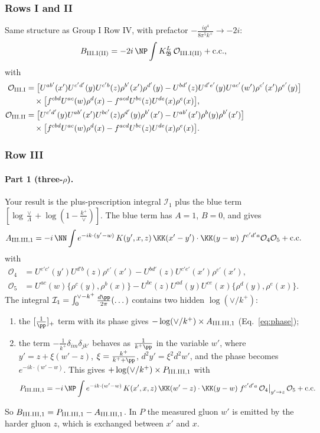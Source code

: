 \subsubsection{Rows I and II}
Same structure as Group I Row IV, with prefactor $-\frac{ig^4}{8\pi^5k^+}\to-2i$:
\begin{equation}
B_{\rm III.I(II)}=-2i\,\NP\int K^L_{\mathfrak B}\,\mathcal O_{\rm III.I(II)}+{\rm c.c.},
\end{equation}
with
\begin{align*}
\mathcal O_{\rm III.I}&=\big[U^{ab'}(x')U^{c'd'}(y)U^{c'b}(z)\rho^{b'}(x')\rho^{d'}(y)-U^{bd'}(z)U^{d'e'}(y)U^{ac'}(w')\rho^{c'}(x')\rho^{e'}(y)\big]\\
&\quad\times\big[f^{cbd}U^{ac}(w)\rho^d(x)-f^{acd}U^{bc}(z)U^{de}(x)\rho^e(x)\big],\\
\mathcal O_{\rm III.II}&=\big[U^{c'd'}(y)U^{ab'}(x')U^{bc'}(z)\rho^{d'}(y)\rho^{b'}(x')-U^{ab'}(x')\rho^b(y)\rho^{b'}(x')\big]\\
&\quad\times\big[f^{cbd}U^{ac}(w)\rho^d(x)-f^{acd}U^{bc}(z)U^{de}(x)\rho^e(x)\big].
\end{align*}

\subsubsection{Row III}\label{sec:G3III}
\paragraph{Part 1 (three-$\rho$).} Your result is the plus-prescription integral $\mathcal I_1$ plus the blue term $[\log\frac{\vee}{\Lambda}+\log(1-\frac{k^+}{\vee})]$. The blue term has $A=1$, $B=0$, and gives
\[
A_{\rm III.III,1}=-i\,\NN\int e^{-ik\cdot(y'-w)}\,K(y',x,z)\,\KK(x'-y')\cdot\KK(y-w)\;f^{c'd'a}\mathcal O_4\mathcal O_5+{\rm c.c.}
\]
with
\begin{align*}
\mathcal O_4&=U^{e'c'}(y')U^{d'b}(z)\rho^{e'}(x')-U^{bd'}(z)U^{c'e'}(x')\rho^{e'}(x'),\\
\mathcal O_5&=U^{ac}(w)\{\rho^c(y),\rho^b(x)\}-U^{bc}(z)U^{ad}(y)U^{ce}(x)\{\rho^d(y),\rho^e(x)\}.
\end{align*} The integral $\mathcal I_1=\int_0^{\vee-k^+}\frac{d\pp}{2\pi}(\dots)$ contains two hidden $\log(\vee/k^+)$:
\begin{enumerate}
\item the $[\frac1\pp]_+$ term with its phase gives $-\log(\vee/k^+)\times A_{\rm III.III,1}$ (Eq.~\eqref{eq:phase});
\item the term $-\frac1{k^+}\delta_{im}\delta_{jk'}$ behaves as $\frac{1}{k^+\pp}$ in the variable $w'$, where $y'=z+\xi(w'-z)$, $\xi=\frac{k^+}{k^++\pp}$, $d^2y'=\xi^2d^2w'$, and the phase becomes $e^{-ik\cdot(w'-w)}$. This gives $+\log(\vee/k^+)\times P_{\rm III.III,1}$ with
\[
P_{\rm III.III,1}=-i\,\NP\int e^{-ik\cdot(w'-w)}\,K(x',x,z)\,\KK(w'-z)\cdot\KK(y-w)\;f^{c'd'a}\,\mathcal O_4\big|_{y'\to z}\,\mathcal O_5+{\rm c.c.}
\]
\end{enumerate}
So $B_{\rm III.III,1}=P_{\rm III.III,1}-A_{\rm III.III,1}$. In $P$ the measured gluon $w'$ is emitted by the harder gluon $z$, which is exchanged between $x'$ and $x$.

